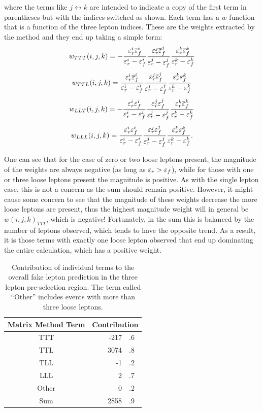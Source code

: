 where the terms like $j\leftrightarrow k$ are intended to indicate
a copy of the first term in parentheses but with the indices 
switched as shown. Each term has a $w$ function that is a function
of the three lepton indices. These are the weights
extracted by the method and they end up taking a simple form:
\begin{equation}
\label{eq:mxm_wttt}
w_{TTT}(i,j,k) = 
-\frac{\varepsilon_r^i\overline{\varepsilon}_f^i}{\varepsilon_r^i-\varepsilon_f^i}
\frac{\varepsilon_r^j\overline{\varepsilon}_f^j}{\varepsilon_r^j-\varepsilon_f^j}
\frac{\varepsilon_r^k\overline{\varepsilon}_f^k}{\varepsilon_r^k-\varepsilon_f^k}
\end{equation}
\begin{equation}
\label{eq:mxm_wttl}
w_{TTL}(i,j,k) = 
\frac{\varepsilon_r^i\overline{\varepsilon}_f^i}{\varepsilon_r^i-\varepsilon_f^i}
\frac{\varepsilon_r^j\overline{\varepsilon}_f^j}{\varepsilon_r^j-\varepsilon_f^j}
\frac{\varepsilon_r^k\varepsilon_f^k}{\varepsilon_r^k-\varepsilon_f^k}
\end{equation}
\begin{equation}
\label{eq:mxm_wllt}
w_{LLT}(i,j,k) =  
- \frac{\varepsilon_r^i\varepsilon_f^i}{\varepsilon_r^i-\varepsilon_f^i}
\frac{\varepsilon_r^j\varepsilon_f^j}{\varepsilon_r^j-\varepsilon_f^j}
\frac{\varepsilon_r^k\overline{\varepsilon}_f^k}{\varepsilon_r^k-\varepsilon_f^k}
\end{equation}
\begin{equation}
\label{eq:mxm_wlll}
w_{LLL}(i,j,k) =  
\frac{\varepsilon_r^i\varepsilon_f^i}{\varepsilon_r^i-\varepsilon_f^i}
\frac{\varepsilon_r^j\varepsilon_f^j}{\varepsilon_r^j-\varepsilon_f^j}
\frac{\varepsilon_r^k\varepsilon_f^k}{\varepsilon_r^k-\varepsilon_f^k}.
\end{equation}


One can see that for the case of zero or two loose leptons present, 
the magnitude of the weights are always negative (as long
as $\varepsilon_r > \varepsilon_f$), while for those with one or three loose leptons 
present the magnitude is positive. As with the single
lepton case, this is not a concern as the sum should remain positive.
However, it might cause some concern to see that 
the magnitude of these weights decrease the more loose leptons 
are present, thus the highest magnitude weight
will in general be $w(i,j,k)_{TTT}$, which is negative!
Fortunately, in the sum this is balanced by the number of 
leptons observed, which tends to have the opposite trend.
As a result, it is those terms with exactly one loose lepton
observed that end up dominating the entire calculation, which
has a positive weight. 

\begin{table}[ht]
\centering
\begin{tabular}{c|cr@{}l}
Matrix Method Term & \multicolumn{3}{c}{Contribution} \\
\hline
\hline
TTT & &-217&.6\\
TTL & &3074&.8 \\
TLL & &-1&.2 \\
LLL & &2&.7 \\ 
Other & &0&.2 \\
\hline
Sum & &2858&.9
\end{tabular}
\label{tab:mxm_components}
\caption{Contribution of individual terms to the overall fake lepton 
prediction in the three lepton pre-selection region. The 
term called ``Other'' includes events with more than three loose leptons. }
\end{table}

